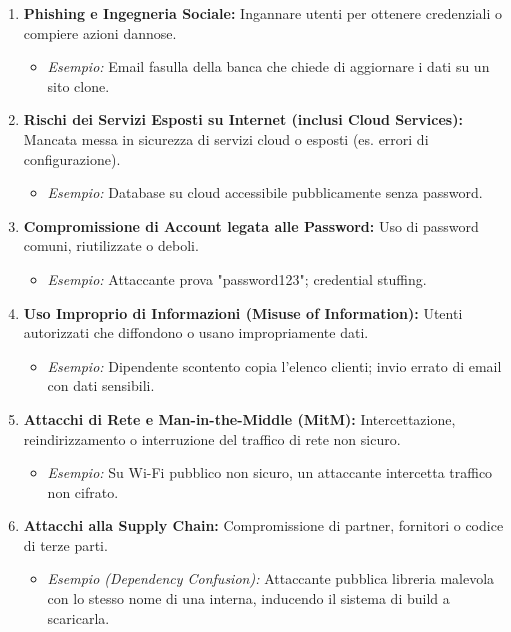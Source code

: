 \documentclass{article}
\begin{document}
\begin{enumerate}
    \item \textbf{Phishing e Ingegneria Sociale:} Ingannare utenti per ottenere credenziali o compiere azioni dannose.
        \begin{itemize}
            \item \textit{Esempio:} Email fasulla della banca che chiede di aggiornare i dati su un sito clone.
        \end{itemize}
    \item \textbf{Rischi dei Servizi Esposti su Internet (inclusi Cloud Services):} Mancata messa in sicurezza di servizi cloud o esposti (es. errori di configurazione).
        \begin{itemize}
            \item \textit{Esempio:} Database su cloud accessibile pubblicamente senza password.
        \end{itemize}
    \item \textbf{Compromissione di Account legata alle Password:} Uso di password comuni, riutilizzate o deboli.
        \begin{itemize}
            \item \textit{Esempio:} Attaccante prova "password123"; credential stuffing.
        \end{itemize}
    \item \textbf{Uso Improprio di Informazioni (Misuse of Information):} Utenti autorizzati che diffondono o usano impropriamente dati.
        \begin{itemize}
            \item \textit{Esempio:} Dipendente scontento copia l'elenco clienti; invio errato di email con dati sensibili.
        \end{itemize}
    \item \textbf{Attacchi di Rete e Man-in-the-Middle (MitM):} Intercettazione, reindirizzamento o interruzione del traffico di rete non sicuro.
        \begin{itemize}
            \item \textit{Esempio:} Su Wi-Fi pubblico non sicuro, un attaccante intercetta traffico non cifrato.
        \end{itemize}
    \item \textbf{Attacchi alla Supply Chain:} Compromissione di partner, fornitori o codice di terze parti.
        \begin{itemize}
            \item \textit{Esempio (Dependency Confusion):} Attaccante pubblica libreria malevola con lo stesso nome di una interna, inducendo il sistema di build a scaricarla.

\end{itemize}
\end{enumerate}
\end{document}
